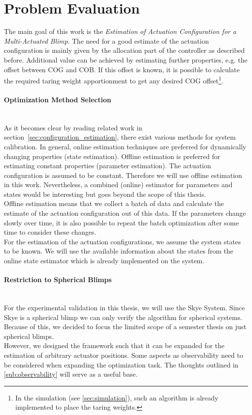 \section{Problem Evaluation}
\label{sec:problem_evaluation}
The main goal of this work is the \textit{Estimation of Actuation Configuration for a Multi-Actuated Blimp}.
The need for a good estimate of the actuation configuration is mainly given by the allocation part of the controller as described before.
Additional value can be achieved by estimating further properties, e.g. the offset between COG and COB.
If this offset is known, it is possible to calculate the required taring weight apportionment to get any desired COG offset\footnote{
In the simulation (see \cref{sec:simulation}), such an algorithm is already implemented to place the taring weights.
}.

\paragraph{Optimization Method Selection} ~\\
As it becomes clear by reading related work in section~\ref{sec:configuration_estimation}, there exist various methods for system calibration.
In general, online estimation techniques are preferred for dynamically changing properties (state estimation).
Offline estimation is preferred for estimating constant properties (parameter estimation).
The actuation configuration is assumed to be constant.
Therefore we will use offline estimation in this work.
Nevertheless, a combined (online) estimator for parameters and states would be interesting but goes beyond the scope of this thesis.
\\

Offline estimation means that we collect a batch of data and calculate the estimate of the actuation configuration out of this data.
If the parameters change slowly over time, it is also possible to repeat the batch optimization after some time to consider these changes.
\\

For the estimation of the actuation configurations, we assume the system states to be known.
We will use the available information about the states from the online state estimator which is already implemented on the system.

\paragraph{Restriction to Spherical Blimps} ~\\
For the experimental validation in this thesis, we will use the Skye System.
Since Skye is a spherical blimp we can only verify the algorithm for spherical systems.
Because of this, we decided to focus the limited scope of a semester thesis on just spherical blimps. \\
However, we designed the framework such that it can be expanded for the estimation of arbitrary actuator positions.
Some aspects as observability need to be considered when expanding the optimization task.
The thoughts outlined in \cref{sub:observability} will serve as a useful base.

